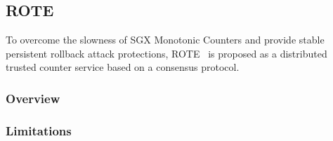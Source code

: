 \subsection{ROTE}

To overcome the slowness of SGX Monotonic Counters and provide stable persistent rollback attack protections, ROTE~\cite{} is proposed as a distributed trusted counter service based on a consensus protocol.

\subsubsection{Overview}



\subsubsection{Limitations}



